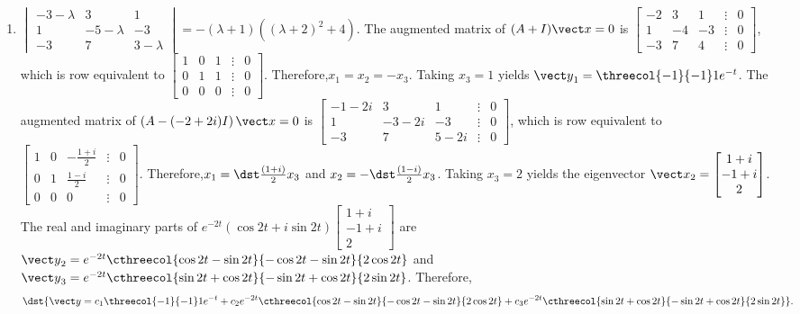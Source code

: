 \documentclass[openany]{book}
\newenvironment{sectionSolutions}{
 \begin{enumerate}[item-label={\thesection.\arabic{enumi}.}]
}{
 \end{enumerate}
}
\begin{document}
\begin{sectionSolutions}
\item
$\begin{vmatrix}-3-\lambda&3&1\\1&-5-\lambda&-3\\-3
&7&3-\lambda\end{vmatrix}=-(\lambda+1)\left((\lambda+2)^2+4\right)$.
 The augmented matrix of $(A+I){\vect x=0}$ is
$\begin{bmatrix}-2&3&1&\vdots&0\\1&-4&-3&\vdots&0\\
-3&7&4&\vdots&0\end{bmatrix}$,
which is row equivalent to
$\begin{bmatrix} 1&0&1&\vdots&0\\ 0&1&1&
\vdots&0\\ 0&0&0&\vdots&0\end{bmatrix}$.
Therefore,$x_1=x_2=-x_3$.  Taking $x_3=1$ yields
 ${\vect y}_1=\threecol{-1}{-1}1e^{-t}$.
The augmented matrix of
$\left(A-(-2+2i)I\right){\vect x=0}$ is
$\begin{bmatrix}-1-2i&3&1&\vdots&0\\1&
-3-2i&-3&\vdots&0\\-3&7&5-2i&\vdots&0
\end{bmatrix}$,
which is row equivalent to
$\begin{bmatrix} 1&0&-\frac{1+i}{2}&\vdots&0\\
0&1&\frac{1-i}{2}&
\vdots&0\\ 0&0&0&\vdots&0\end{bmatrix}$.
Therefore,$x_1=\dst\frac{(1+i)}{2}x_3$ and $x_2=-\dst\frac{(1-i)}{2}x_3$.
Taking $x_3=2$ yields the eigenvector
${\vect x}_2=\begin{bmatrix}1+i\\-1+i\\2\end{bmatrix}$.
The real and imaginary parts of
$e^{-2t}(\cos2t+i\sin2t)\begin{bmatrix}1+i\\-1+i\\2\end{bmatrix}$
 are
${\vect y}_2=e^{-2t}\cthreecol{\cos2t-\sin2t}{-\cos2t-\sin2t}{2\cos2t}$
 and
${\vect y}_3=e^{-2t}\cthreecol{\sin2t+\cos2t}{-\sin2t+\cos2t}{2\sin2t}$.
 Therefore,
\[
\dst{{\vect y}=c_1\threecol{-1}{-1}1e^{-t}+c_2e^{-2t}\cthreecol{\cos2t-\sin
2t}{-\cos2t-\sin  2t}{2\cos2t}+c_3e^{-2t}\cthreecol
{\sin2t+\cos2t}{-\sin2t+\cos2t}{2\sin2t}}.
\]



\end{sectionSolutions}
\end{document}
